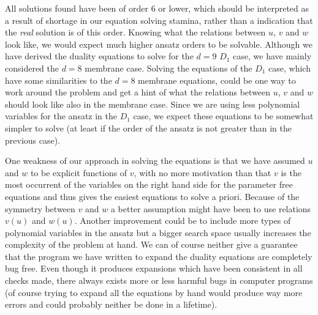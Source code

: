 All solutions found have been of order 6 or lower, which should be interpreted as a result of shortage in our equation solving stamina, rather than a indication that the {\it{real}} solution is of this order.   
Knowing what the relations between $u$, $v$ and $w$ look like, we would expect much higher ansatz orders to be solvable.
Although we have derived the duality equations  to solve for the $d=9$ $D_1$ case, we have mainly considered the $d=8$ membrane case.
Solving the equations of the $D_1$ case, which have some similarities to the $d=8$ membrane equations, could be one way to work around the problem and get a hint of what the relations between $u$, $v$ and $w$ should look like also in the membrane case.
Since we are using less polynomial variables for the ansatz in the $D_1$ case, we expect these equations to be somewhat simpler to solve (at least if the order of the ansatz is not greater than in the previous case).

One weakness of our approach in solving the equations is that we have assumed $u$ and $w$ to be explicit functions of $v$, with no more motivation than that $v$ is the most occurrent of the variables on the right hand side for the parameter free equations and thus gives the easiest equations to solve a priori.   
Because of the symmetry between $v$ and $w$ a better assumption might have been to use relations $v(u)$ and $w(u)$.  
Another improvement could be to include more types of polynomial variables in the ansatz but a bigger search space usually increases the complexity of the problem at hand.
We can of course neither give a guarantee that the program we have written to expand the duality equations are completely bug free. Even though it produces expansions which have been consistent in all checks made, there always exists more or less harmful bugs in computer programs (of course trying to expand all the equations by hand would produce way more errors and could probably neither be done in a lifetime).





